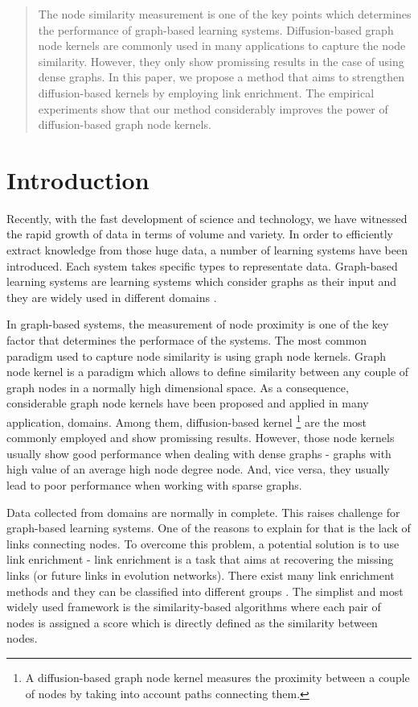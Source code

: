 \documentclass{article}
\begin{document}
\begin{abstract} 
The node similarity measurement is one of the key points which determines the performance of graph-based learning systems. Diffusion-based graph node kernels are commonly used in many applications to capture the node similarity. However, they only show promissing results in the case of using dense graphs. In this paper, we propose a method that aims to strengthen diffusion-based kernels by employing link enrichment. The empirical experiments show that our method considerably improves the power of diffusion-based graph node kernels. 
\end{abstract} 
\section{Introduction}
\label{introduction}
Recently, with the fast development of science and technology, we have witnessed the rapid growth of data in terms of volume and variety. In order to efficiently extract knowledge from those huge data, a number of learning systems have been introduced. Each system takes specific types to representate data. Graph-based learning systems are learning systems which consider graphs as their input and they are widely used in different domains \cite{references here}.

In graph-based systems, the measurement of node proximity is one of the key factor that determines the performace of the systems. The most common paradigm used to capture node similarity is using graph node kernels. Graph node kernel is a paradigm which allows to define similarity between any couple of graph nodes in a normally high dimensional space. As a consequence, considerable graph node kernels have been proposed and applied in many application, domains. Among them, diffusion-based kernel \footnote{A diffusion-based graph node kernel measures the proximity between a couple of nodes by taking into account paths connecting them.} are the most commonly employed and show promissing results. However, those node kernels usually show good performance when dealing with dense graphs - graphs with high value of an average high node degree node. And, vice versa, they usually lead to poor performance when working with sparse graphs.

Data collected from domains are normally in complete. This raises challenge for graph-based learning systems. One of the reasons to explain for that is the lack of links connecting nodes. To overcome this problem, a potential solution is to use link enrichment - link enrichment is a task that aims at recovering the missing links (or future links in evolution networks). There exist many link enrichment methods and they can be classified into different groups \cite{ref-here}. The simplist and most widely used framework is the similarity-based algorithms where each pair of nodes is assigned a score which is directly defined as the similarity between nodes.
\end{document}
